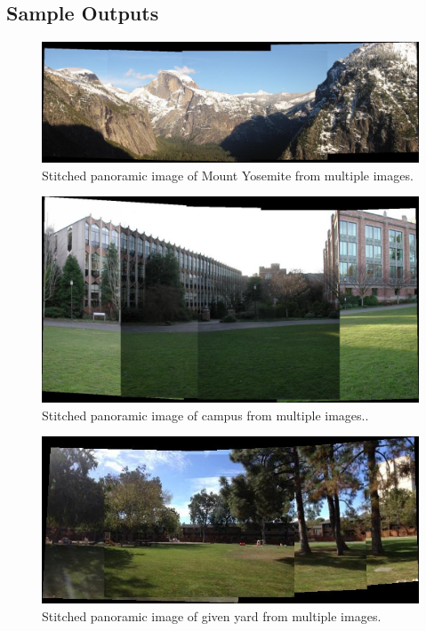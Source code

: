 \documentclass{article}
\begin{document}
\newpage

\subsection{Sample Outputs}
\begin{figure}[!htb]
  \centering
  \includegraphics[width=.99\textwidth]{yosemite_pano.jpg}
  \caption{Stitched panoramic image of Mount Yosemite from multiple images.}
\end{figure}%
\begin{figure}[!htb]
  \centering
  \includegraphics[width=.99\textwidth]{campus_pano.jpg}
  \caption{Stitched panoramic image of campus from multiple images..}
\end{figure}%
\newpage
\begin{figure}[!htb]
  \centering
  \includegraphics[width=.99\textwidth]{yard_pano.jpg}
  \caption{Stitched panoramic image of given yard from multiple images.}
\end{figure}%
\end{document}
